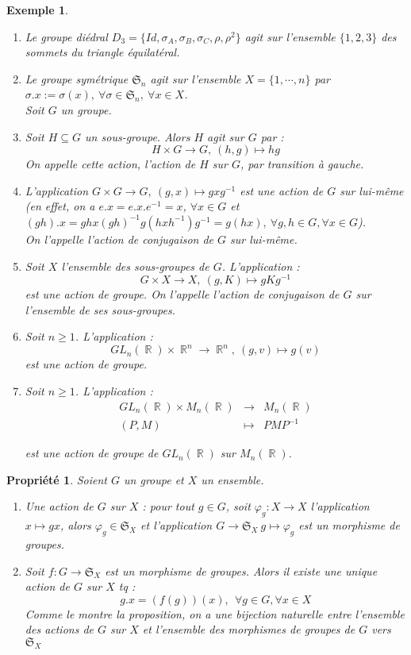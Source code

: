 \documentclass[a4paper, oneside]{report}
\theoremstyle{break}
\newtheorem{propr}[thm]{Propriété}
\newtheorem{exem}[thm]{Exemple}
\newcommand{\x}{\times}
\DeclareMathOperator{\R}{\mathbb{R}}
\renewcommand{\S}{\mathfrak{S}}
\begin{document}
\begin{exem}
	\begin{enumerate}
		\item Le groupe diédral $D_3=\{Id, \sigma_A, \sigma_B, \sigma_C, \rho, \rho^2\}$ agit sur l'ensemble $\{1,2,3\}$ des sommets du triangle équilatéral.
		\item Le groupe symétrique $\S_n$ agit sur l'ensemble $X=\{1,\cdots,n\}$ par $\sigma.x := \sigma(x), ~\forall \sigma \in \S_n,~\forall x\in X$.\\
		
		Soit $G$ un groupe.
		\item Soit $H\subseteq G$ un sous-groupe. Alors $H$ agit sur $G$ par :
		$$H\x G \rightarrow G,~ (h,g)\mapsto hg$$
		On appelle cette action, l'action de $H$ sur $G$, par transition à gauche.
		\item L'application $G\x G \rightarrow G,~ (g,x) \mapsto gxg^{-1}$ est une action de $G$ sur lui-même (en effet, on a $e.x = e.x.e^{-1} =x$, $\forall x\in G$ et $(gh).x=ghx(gh)^{-1}g(hxh^{-1})g^{-1}=g(hx),~\forall g,h\in G, \forall x\in G$).\\
		On l'appelle l'action de conjugaison de $G$ sur lui-même.
		\item Soit $X$ l'ensemble des sous-groupes de $G$. L'application :
		$$G\x X \rightarrow X,~(g,K)\mapsto gKg^{-1}$$
		est une action de groupe. On l'appelle l'action de conjugaison de $G$ sur l'ensemble de ses sous-groupes.
		\item Soit $n\geq 1$. L'application :
		$$GL_n(\R)\x \R^n \rightarrow \R^n,~(g,v)\mapsto g(v)$$
		est une action de groupe.
		\item Soit $n\geq 1$. L'application :
		$$\begin{array}{lll}
		GL_n(\R)\x M_n(\R)&\rightarrow & M_n(\R)\\
		(P,M)&\mapsto & PMP^{-1}
		\end{array}$$
		
		est une action de groupe de $GL_n(\R)$ sur $M_n(\R)$.
	\end{enumerate}
\end{exem}

\begin{propr}
	Soient $G$ un groupe et $X$ un ensemble.
	\begin{enumerate}
		\item Une action de $G$ sur $X$ : pour tout $g\in G$, soit $\varphi_g :X \rightarrow X$ l'application $x\mapsto gx$, alors $\varphi_g \in \S_X$ et l'application $G\rightarrow \S_X~g\mapsto \varphi_g$ est un morphisme de groupes.
		\item Soit $f:G\rightarrow \S_X$ est un morphisme de groupes. Alors il existe une unique action de $G$ sur $X$ tq :
		$$g.x = (f(g))(x),~~\forall g\in G,\forall x\in X$$
		Comme le montre la proposition, on a une bijection naturelle entre l'ensemble des actions de $G$ sur $X$ et l'ensemble des morphismes de groupes de $G$ vers $\S_X$
	\end{enumerate}
\end{propr}
\end{document}

